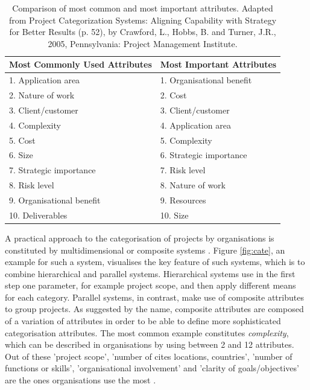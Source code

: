 \begin{table}[!htb]
\captionsetup{font=small}
\centering
\footnotesize
    \begin{tabular}{| l | l |}
    \hline
    {\bf Most Commonly Used Attributes} & {\bf Most Important Attributes} \\
    \hline
    1. Application area & 1. Organisational benefit \\
    2. Nature of work & 2. Cost \\
    3. Client/customer & 3. Client/customer \\
    4. Complexity & 4. Application area \\
    5. Cost & 5. Complexity  \\
    6. Size & 6. Strategic importance \\
    7. Strategic importance & 7. Risk level \\
    8. Risk level & 8. Nature of work \\
    9. Organisational benefit & 9. Resources \\
    10. Deliverables & 10. Size \\
     \hline 
    \end{tabular}
    \caption[Comparison of most common and most important attributes]{Comparison of most common and most important attributes. Adapted from Project Categorization Systems: Aligning Capability with Strategy for Better Results (p. 52), by Crawford, L., Hobbs, B. and Turner, J.R., 2005, Pennsylvania: Project Management Institute.}
\label{tab:cate2}
\end{table}


A practical approach to the categorisation of projects by organisations is constituted by multidimensional or composite systems \cite{crawford06}. Figure \ref{fig:cate}, an example for such a system, visualises the key feature of such systems, which is to combine hierarchical and parallel systems. Hierarchical systems use in the first step one parameter, for example project scope, and then apply different means for each category. Parallel systems, in contrast, make use of composite attributes to group projects. As suggested by the name, composite attributes are composed of a variation of attributes in order to be able to define more sophisticated categorisation attributes. The most common example constitutes \textit{complexity}, which can be described in organisations by using between 2 and 12 attributes. Out of these 'project scope', 'number of cites locations, countries', 'number of functions or skills', 'organisational involvement' and 'clarity of goals/objectives' are the ones organisations use the most \cite{crawford05}. \\


